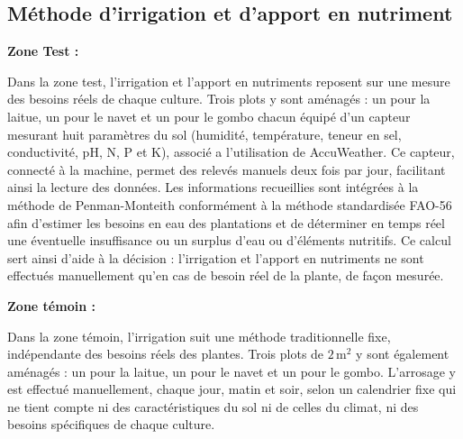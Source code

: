 \subsection{Méthode d’irrigation et d’apport en nutriment} 
\textbf{Zone Test :}

Dans la zone test, l'irrigation et l'apport en nutriments reposent sur une mesure des besoins réels de chaque culture. Trois plots y sont aménagés : un pour la laitue, un pour le navet et un pour le gombo chacun équipé d'un capteur mesurant huit paramètres du sol (humidité, température, teneur en sel, conductivité, pH, N, P et K), associé a l'utilisation de AccuWeather. Ce capteur, connecté à la machine, permet des relevés manuels deux fois par jour, facilitant ainsi la lecture des données. Les informations recueillies sont intégrées à la méthode de Penman-Monteith \cite{allen_crop_1998-1} conformément à la méthode standardisée FAO-56 \cite[chap.~2]{allen_crop_1998-1} afin d'estimer les besoins en eau des plantations et de déterminer en temps réel une éventuelle insuffisance ou un surplus d'eau ou d'éléments nutritifs. Ce calcul sert ainsi d'aide à la décision : l'irrigation et l'apport en nutriments ne sont effectués manuellement qu'en cas de besoin réel de la plante, de façon mesurée. 

 \textbf{Zone témoin :}
 
Dans la zone témoin, l'irrigation suit une méthode traditionnelle fixe, indépendante des besoins réels des plantes. Trois plots de $2\,\mathrm{m^2}$ y sont également aménagés : un pour la laitue, un pour le navet et un pour le gombo. L'arrosage y est effectué manuellement, chaque jour, matin et soir, selon un calendrier fixe qui ne tient compte ni des caractéristiques du sol ni de celles du climat, ni des besoins spécifiques de chaque culture.



